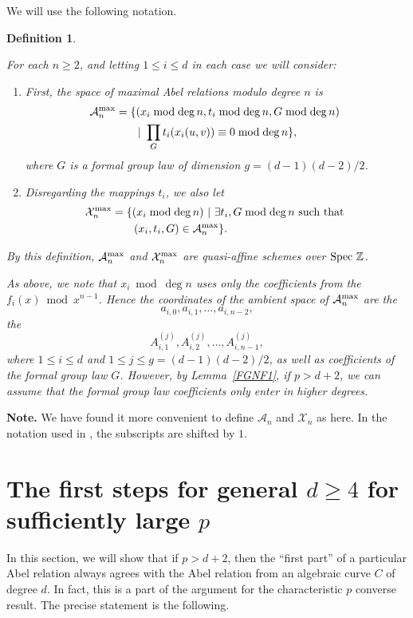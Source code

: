 \documentclass[12pt]{amsart}
\theoremstyle{theorem}
\newtheorem{defn}{Definition}
\newcommand{\ZZ}{\mathbb{Z}}
\begin{document}
\vskip 10pt
We will use the following notation.

\begin{defn}  
\label{AXDef}
{\rm For each $n \ge 2$, and letting $1\le i \le d$ in each case we will consider:
\begin{enumerate}
\item[(1)]  First, the space of maximal Abel relations modulo degree $n$ is
\begin{align*}
\mathcal{A}_n^{\rm max} &= \{ (x_i \bmod \deg n, t_i \bmod \deg n, G \bmod \deg n)\ \\
&\qquad \vert\ \prod_G t_i(x_i(u,v)) \equiv 0 \bmod \deg n \},
\end{align*}
where $G$ is a formal group law of dimension $g = (d-1)(d-2)/2$.
\item[(2)]  Disregarding the mappings $t_i$, we also let
\begin{align*}
\mathcal{X}_n^{\rm max} &= \{ (x_i \bmod \deg n)\ \vert\ \exists t_i, G \bmod \deg n \text{ such that } \\
&\qquad (x_i, t_i, G) \in \mathcal{A}_n^{\rm max}\}.
\end{align*}
\end{enumerate}
By this definition, $\mathcal{A}_n^{\rm max}$ and $\mathcal{X}_n^{\rm max}$ 
are quasi-affine schemes over ${\rm Spec}\ \ZZ$.  

As above, we note that $x_i \bmod \deg n$ uses only the coefficients from the $f_i(x) \bmod x^{n-1}$.  Hence the coordinates
of the ambient space of $\mathcal{A}_n^{\rm max}$ are the 
$$a_{i,0}, a_{i,1}, \ldots, a_{i,n-2},$$ 
the $$A_{i,1}^{(j)}, A_{i,2}^{(j)}, \ldots, A_{i,n-1}^{(j)},$$
where $1 \le i \le d$ and $1 \le j \le g = (d-1)(d-2)/2$, as well as coefficients of the formal group law $G$.  
However, by Lemma~\ref{FGNF1}, if $p > d + 2$, we can assume that the formal group law coefficients only
enter in higher degrees.
}
\end{defn}

\noindent
{\bf Note.}  We have found it more convenient to define $\mathcal{A}_n$ and $\mathcal{X}_n$ as here.  In the notation used in \cite{Lit}, the 
subscripts are shifted by $1$.  

\section{The first steps for general $d \ge 4$ for sufficiently large $p$}
\label{FirstSteps}

In this section, we will show that if $p > d + 2$, then the ``first part'' of a particular Abel relation always agrees with the Abel relation from an algebraic
curve $C$ of degree $d$.   In fact, this is a part of the argument for the characteristic $p$ converse result. The precise statement is the following.
\end{document}
